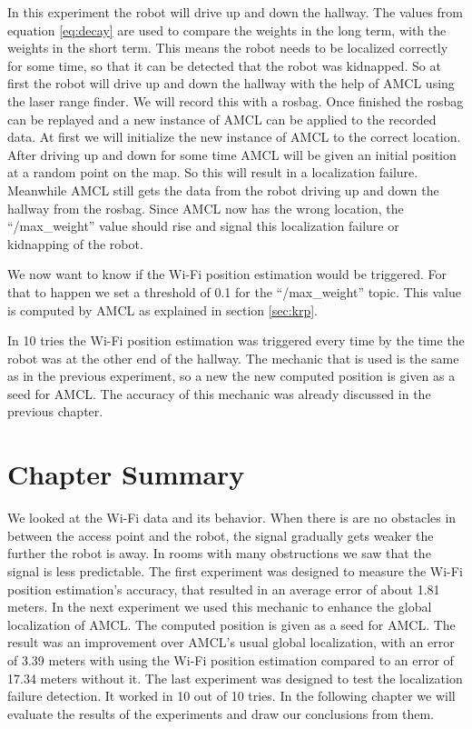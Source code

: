 In this experiment the robot will drive up and down the hallway. The values from equation \ref{eq:decay} are used to compare the weights in the long term, with the weights in the short term. This means the robot needs to be localized correctly for some time, so that it can be detected that the robot was kidnapped. So at first the robot will drive up and down the hallway with the help of AMCL using the laser range finder. We will record this with a rosbag. Once finished the rosbag can be replayed and a new instance of AMCL can be applied to the recorded data. At first we will initialize the new instance of AMCL to the correct location. After driving up and down for some time AMCL will be given an initial position at a random point on the map. So this will result in a localization failure. Meanwhile AMCL still gets the data from the robot driving up and down the hallway from the rosbag. Since AMCL now has the wrong location, the ``/max\_weight'' value should rise and signal this localization failure or kidnapping of the robot. 

We now want to know if the Wi-Fi position estimation would be triggered. For that to happen we set a threshold of 0.1 for the ``/max\_weight'' topic. This value is computed by AMCL as explained in section \ref{sec:krp}. 

In 10 tries the Wi-Fi position estimation was triggered every time by the time the robot was at the other end of the hallway. The mechanic that is used is the same as in the previous experiment, so a new the new computed position is given as a seed for AMCL. The accuracy of this mechanic was already discussed in the previous chapter. 	
\section{Chapter Summary}
We looked at the Wi-Fi data and its behavior. When there is are no obstacles in between the access point and the robot, the signal gradually gets weaker the further the robot is away. In rooms with many obstructions we saw that the signal is less predictable. 
The first experiment was designed to measure the Wi-Fi position estimation's accuracy, that resulted in an average error of about 1.81 meters. In the next experiment we used this mechanic to enhance the global localization of AMCL. The computed position is given as a seed for AMCL. The result was an improvement over AMCL's usual global localization, with an error of 3.39 meters with using the Wi-Fi position estimation compared to an error of 17.34 meters without it.
The last experiment was designed to test the localization failure detection. It worked in 10 out of 10 tries. 
In the following chapter we will evaluate the results of the experiments and draw our conclusions from them.
